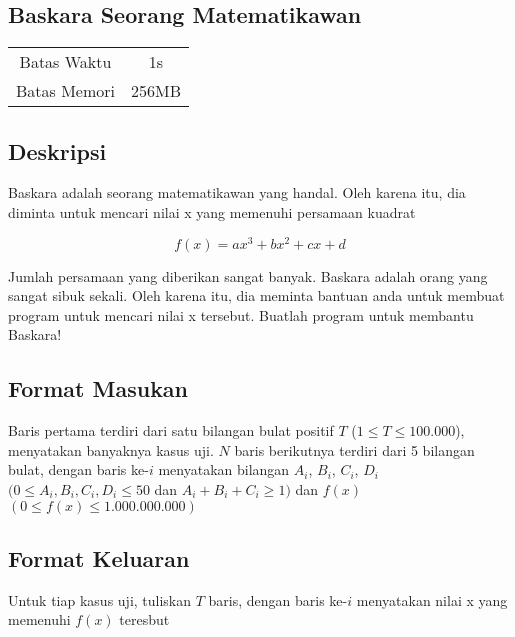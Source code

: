 \documentclass{article}
\begin{document}
\begin{center}

    
    \section*{Baskara Seorang Matematikawan} %

    \begin{tabular}{ | c c | }
        \hline
        Batas Waktu  & 1s \\    %
        Batas Memori & 256MB \\  %
        \hline
    \end{tabular}
\end{center}

\subsection*{Deskripsi}

Baskara adalah seorang matematikawan yang handal. Oleh karena itu, dia diminta untuk mencari nilai x yang memenuhi persamaan kuadrat 

\[ f(x) = ax^3 + bx^2 + cx + d \]

Jumlah persamaan yang diberikan sangat banyak. Baskara adalah orang yang sangat sibuk sekali. Oleh karena itu, dia meminta bantuan anda untuk membuat program untuk mencari nilai x tersebut. Buatlah program untuk membantu Baskara!

\subsection*{Format Masukan}

Baris pertama terdiri dari satu bilangan bulat positif $T$ ($1 \leq T \leq 100.000$), menyatakan banyaknya kasus uji.
$N$ baris berikutnya terdiri dari 5 bilangan bulat, dengan baris ke-$i$ menyatakan bilangan $A_i$, $B_i$, $C_i$, $D_i$  $(0 \leq A_i,B_i,C_i,D_i \leq 50 $ dan $ A_i + B_i + C_i \geq 1)$  dan $f(x)$ $(0 \leq f(x) \leq 1.000.000.000 )$

\subsection*{Format Keluaran}

Untuk tiap kasus uji, tuliskan $T$ baris, dengan baris ke-$i$ menyatakan nilai x yang memenuhi $f(x)$ teresbut
\\
\end{document}
